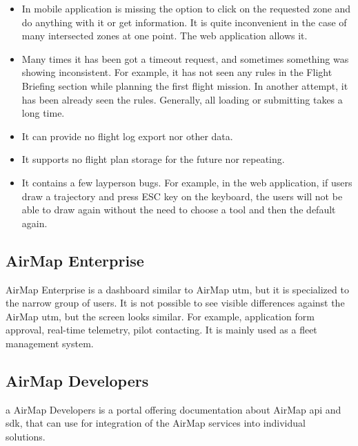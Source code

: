 \begin{itemize}
    \item In mobile application is missing the option to click on the requested zone and do anything with it or get information.
    It is quite inconvenient in the case of many intersected zones at one point.
    The web application allows it.
    \item Many times it has been got a timeout request, and sometimes something was showing inconsistent.
    For example, it has not seen any rules in the Flight Briefing section while planning the first flight mission.
    In another attempt, it has been already seen the rules.
    Generally, all loading or submitting takes a long time.
    \item It can provide no flight log export nor other data.
    \item It supports no flight plan storage for the future nor repeating.
    \item It contains a few layperson bugs.
    For example, in the web application, if users draw a trajectory and press ESC key on the keyboard, the users will not be able to draw again without the need to choose a tool and then the default again.
\end{itemize}


\subsection{AirMap Enterprise}\label{subsec:airmap-enterprise}
AirMap Enterprise is a dashboard similar to AirMap \acrshort{utm}, but it is specialized to the narrow group of users.
It is not possible to see visible differences against the AirMap \acrshort{utm}, but the screen looks similar.
For example, application form approval, real-time telemetry, pilot contacting.
It is mainly used as a fleet management system.


\subsection{AirMap Developers}\label{subsec:airmap-developers}a
AirMap Developers is a portal offering documentation about AirMap \acrshort{api} and \acrshort{sdk}, that can use for integration of the AirMap services into individual solutions.~\cite{airMapDevelopers}
